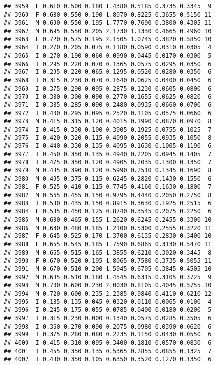 \documentclass[
]{article}
\begin{document}
\begin{verbatim}
## 3959  F 0.610 0.500 0.180 1.4380 0.5185 0.3735 0.3345  9
## 3960  F 0.680 0.550 0.190 1.8070 0.8225 0.3655 0.5150 11
## 3961  M 0.690 0.550 0.195 1.7770 0.7690 0.3800 0.4305 11
## 3962  M 0.695 0.550 0.205 2.1730 1.1330 0.4665 0.4960 10
## 3963  F 0.720 0.575 0.195 2.1505 1.0745 0.3820 0.5850 10
## 3964  I 0.270 0.205 0.075 0.1180 0.0590 0.0310 0.0305  4
## 3965  I 0.270 0.190 0.060 0.0990 0.0445 0.0170 0.0300  5
## 3966  I 0.295 0.220 0.070 0.1365 0.0575 0.0295 0.0350  6
## 3967  I 0.295 0.220 0.065 0.1295 0.0520 0.0280 0.0350  6
## 3968  I 0.315 0.230 0.070 0.1640 0.0625 0.0400 0.0450  6
## 3969  I 0.375 0.290 0.095 0.2875 0.1230 0.0605 0.0800  6
## 3970  I 0.380 0.300 0.090 0.2770 0.1655 0.0625 0.0820  6
## 3971  I 0.385 0.285 0.090 0.2480 0.0935 0.0660 0.0700  6
## 3972  I 0.400 0.295 0.095 0.2520 0.1105 0.0575 0.0660  6
## 3973  M 0.415 0.315 0.120 0.4015 0.1990 0.0870 0.0970  8
## 3974  I 0.415 0.330 0.100 0.3905 0.1925 0.0755 0.1025  7
## 3975  I 0.420 0.320 0.115 0.4090 0.2055 0.0935 0.1050  8
## 3976  I 0.440 0.330 0.135 0.4095 0.1630 0.1005 0.1190  6
## 3977  I 0.450 0.350 0.135 0.4940 0.2205 0.0945 0.1405  7
## 3978  I 0.475 0.350 0.120 0.4905 0.2035 0.1300 0.1350  7
## 3979  M 0.485 0.390 0.120 0.5990 0.2510 0.1345 0.1690  8
## 3980  M 0.495 0.375 0.115 0.6245 0.2820 0.1430 0.1550  6
## 3981  F 0.525 0.410 0.115 0.7745 0.4160 0.1630 0.1800  7
## 3982  M 0.565 0.455 0.150 0.9795 0.4440 0.2050 0.2750  8
## 3983  I 0.580 0.435 0.150 0.8915 0.3630 0.1925 0.2515  6
## 3984  F 0.585 0.450 0.125 0.8740 0.3545 0.2075 0.2250  6
## 3985  M 0.600 0.465 0.155 1.2620 0.6245 0.2455 0.3300 10
## 3986  M 0.630 0.480 0.185 1.2100 0.5300 0.2555 0.3220 11
## 3987  F 0.645 0.525 0.170 1.3700 0.6135 0.2830 0.3400 10
## 3988  F 0.655 0.545 0.185 1.7590 0.6865 0.3130 0.5470 11
## 3989  M 0.665 0.515 0.165 1.3855 0.6210 0.3020 0.3445  8
## 3990  F 0.670 0.520 0.195 1.8065 0.7580 0.3735 0.5055 11
## 3991  M 0.670 0.510 0.200 1.5945 0.6705 0.3845 0.4505 10
## 3992  M 0.685 0.510 0.180 1.4545 0.6315 0.3105 0.3725  9
## 3993  M 0.700 0.600 0.230 2.0030 0.8105 0.4045 0.5755 10
## 3994  M 0.720 0.600 0.235 2.2385 0.9840 0.4110 0.6210 12
## 3995  I 0.185 0.135 0.045 0.0320 0.0110 0.0065 0.0100  4
## 3996  I 0.245 0.175 0.055 0.0785 0.0400 0.0180 0.0200  5
## 3997  I 0.315 0.230 0.000 0.1340 0.0575 0.0285 0.3505  6
## 3998  I 0.360 0.270 0.090 0.2075 0.0980 0.0390 0.0620  6
## 3999  I 0.375 0.280 0.080 0.2235 0.1150 0.0430 0.0550  6
## 4000  I 0.415 0.310 0.095 0.3400 0.1810 0.0570 0.0830  6
## 4001  I 0.455 0.350 0.135 0.5365 0.2855 0.0855 0.1325  7
## 4002  I 0.480 0.350 0.105 0.6350 0.3520 0.1270 0.1350  6

\end{verbatim}
\end{document}
